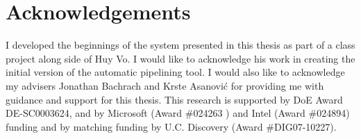 \section{Acknowledgements}
I developed the beginnings of the system presented in this thesis as part of a class project along side of Huy Vo. I would like to acknowledge his work in creating the initial version of the automatic pipelining tool. I would also like to acknowledge my advisers Jonathan Bachrach and Krste  Asanovi\'{c} for providing me with guidance and support for this thesis. This research is supported by DoE Award DE-SC0003624, and by Microsoft (Award \#024263 ) and Intel (Award \#024894) funding and by matching funding by U.C. Discovery (Award \#DIG07-10227).


